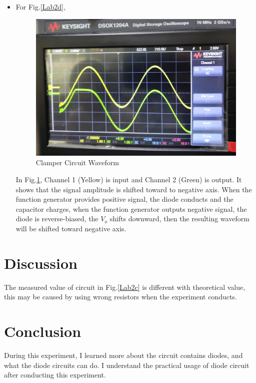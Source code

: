 \begin{itemize}
            \item For Fig.\ref{Lab2d},
            \begin{figure}[h]
                \centering
                \includegraphics[width=0.65\linewidth]{Lab02/2.7_sin_clamper.jpg}
                \caption{Clamper Circuit Waveform}
                \label{2.7clamper}
            \end{figure}
            \FloatBarrier
            In Fig.\ref{2.7clamper}, Channel 1 (Yellow) is input and Channel 2 (Green) is output. It shows that the signal amplitude is shifted toward to negative axis. When the function generator provides positive signal, the diode conducts and the capacitor charges, when the function generator outputs negative signal, the diode is reverse-biased, the $V_o$ shifts downward, then the resulting waveform will be shifted toward negative axis.
    \end{itemize}
    
\section{Discussion}
    The measured value of circuit in Fig.\ref{Lab2c} is different with theoretical value, this may be caused by using wrong resistors when the experiment conducts.

\section{Conclusion}
    During this experiment, I learned more about the circuit contains diodes, and what the diode circuits can do. I understand the practical usage of diode circuit after conducting this experiment.